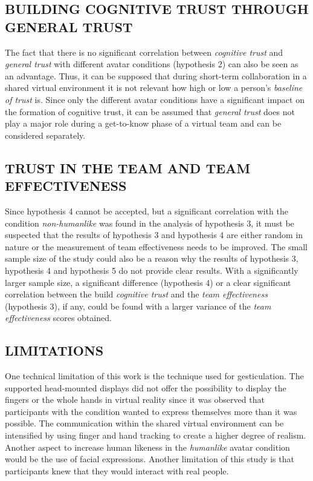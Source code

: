 \documentclass[sigchi]{acmart}
\begin{document}
\subsection{BUILDING COGNITIVE TRUST THROUGH GENERAL TRUST}
The fact that there is no significant correlation between \textit{cognitive trust} and \textit{general trust} with different avatar conditions (hypothesis 2) can also be seen as an advantage.
Thus, it can be supposed that during short-term collaboration in a shared virtual environment it is not relevant how high or low a person's \textit{baseline of trust} is. 
Since only the different avatar conditions have a significant impact on the formation of cognitive trust, it can be assumed that \textit{general trust} does not play a major role during a get-to-know phase of a virtual team and can be considered separately. %

\subsection{TRUST IN THE TEAM AND TEAM EFFECTIVENESS}
Since hypothesis 4 cannot be accepted, but a significant correlation with the condition \textit{non-humanlike} was found in the analysis of hypothesis 3, it must be suspected that the results of hypothesis 3 and hypothesis 4 are either random in nature or the measurement of team effectiveness needs to be improved.
The small sample size of the study could also be a reason why the results of hypothesis 3, hypothesis 4 and hypothesis 5 do not provide clear results. With a significantly larger sample size, a significant difference (hypothesis 4) or a clear significant correlation between the build \textit{cognitive trust} and the \textit{team effectiveness} (hypothesis 3), if any, could be found with a larger variance of the \textit{team effectiveness} scores obtained.

\subsection{LIMITATIONS}
One technical limitation of this work is the technique used for gesticulation. The supported head-mounted displays did not offer the possibility to display the fingers or the whole hands in virtual reality since it was observed that participants with the condition  wanted to express themselves more than it was possible. The communication within the shared virtual environment can be intensified by using finger and hand tracking to create a higher degree of realism. Another aspect to increase human likeness in the \textit{humanlike} avatar condition would be the use of facial expressions.
Another limitation of this study is that participants knew that they would interact with real people. %
\end{document}
